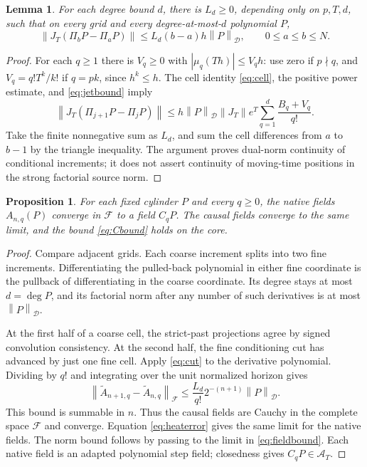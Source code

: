 \documentclass[11pt]{article}
\newtheorem{lemma}[theorem]{Lemma}
\newtheorem{proposition}[theorem]{Proposition}
\theoremstyle{remark}\newtheorem{remark}[theorem]{Remark}
\newcommand{\D}{\mathcal D}\newcommand{\E}{\mathcal E}
\newcommand{\norm}[1]{\left\lVert#1\right\rVert}
\begin{document}
\begin{lemma}\label{lem:cut}
For each degree bound $d$, there is $L_d\geq0$, depending only
on $p,T,d$, such that on every grid and every degree-at-most-$d$
polynomial $P$,
\begin{equation}\label{eq:cut}
 \norm{J_T(\Pi_bP-\Pi_aP)}
 \leq L_d(b-a)h\norm P_{\D},\qquad0\leq a\leq b\leq N.
\end{equation}
\end{lemma}
\begin{proof}
For each $q\geq1$ there is $V_q\geq0$ with
$|\mu_q(Th)|\leq V_qh$: use zero if $p\nmid q$, and
$V_q=q!T^k/k!$ if $q=pk$, since $h^k\leq h$.
The cell identity \eqref{eq:cell}, the positive power estimate,
and \eqref{eq:jetbound} imply
\[
 \norm{J_T(\Pi_{j+1}P-\Pi_jP)}
 \leq h\norm P_{\D}\norm{J_T}e^T
       \sum_{q=1}^d\frac{B_q+V_q}{q!}.
\]
Take the finite nonnegative sum as $L_d$, and sum the cell
differences from $a$ to $b-1$ by the triangle inequality.
The argument proves dual-norm continuity of conditional increments;
it does not assert continuity of moving-time positions in the
strong factorial source norm.
\end{proof}

\begin{proposition}\label{prop:fieldlimit}
For each fixed cylinder $P$ and every $q\geq0$, the native fields
$A_{n,q}(P)$ converge in $\mathcal F$ to a field $C_qP$.
The causal fields converge to the same limit, and the bound
\eqref{eq:Cbound} holds on the core.
\end{proposition}
\begin{proof}
Compare adjacent grids. Each coarse increment splits into two
fine increments. Differentiating the pulled-back polynomial in
either fine coordinate is the pullback of differentiating in the
coarse coordinate. Its degree stays at most $d=\deg P$, and its
factorial norm after any number of such derivatives is at most
$\norm P_{\D}$.

At the first half of a coarse cell, the strict-past projections
agree by signed convolution consistency. At the second half,
the fine conditioning cut has advanced by just one fine cell.
Apply \eqref{eq:cut} to the derivative polynomial. Dividing by
$q!$ and integrating over the unit normalized horizon gives
\begin{equation}\label{eq:adjacent}
 \norm{\widetilde A_{n+1,q}-\widetilde A_{n,q}}_{\mathcal F}
 \leq\frac{L_d}{q!}2^{-(n+1)}\norm P_{\D}.
\end{equation}
This bound is summable in $n$. Thus the causal fields are Cauchy
in the complete space $\mathcal F$ and converge. Equation
\eqref{eq:heaterror} gives the same limit for the native fields.
The norm bound follows by passing to the limit in
\eqref{eq:fieldbound}. Each native field is an adapted polynomial
step field; closedness gives $C_qP\in\mathcal A_T$.
\end{proof}
\end{document}
